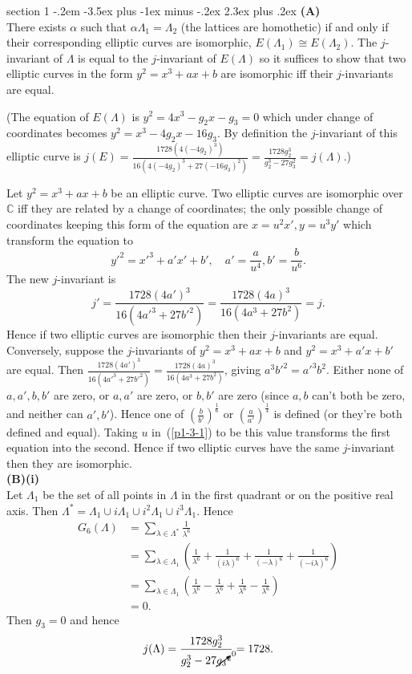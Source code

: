 \documentclass[12pt]{article}
\makeatletter
\theoremstyle{norm}
\newcommand{\C}[0]{\mathbb{C}}
\newcommand{\rc}[1]{\frac{1}{#1}}
\newcommand{\al}[0]{\alpha}
\newcommand{\la}[0]{\lambda}
\newcommand{\La}[0]{\Lambda}
\newcommand{\pa}[1]{\left( {#1} \right)}
\newcommand{\subprob}[1]{\noindent\textbf{#1}\\}
\newcommand{\pf}[2]{\pa{\frac{#1}{#2}}}
\newenvironment{problem}{\@startsection
       {section}
       {1}
       {-.2em}
       {-3.5ex plus -1ex minus -.2ex}
       {2.3ex plus .2ex}
       {\pagebreak[3]%
       \large\bf\noindent{Problem }
       }
       }
       {%
       }
\makeatother
\begin{document}
\begin{problem} {\it }
\subprob{(A)}
There exists $\al$ such that $\al\La_1=\La_2$ (the lattices are homothetic) if and only if their corresponding elliptic curves are isomorphic, $E(\La_1)\cong E(\La_2)$. The $j$-invariant of $\La$ is equal to the $j$-invariant of $E(\La)$ so it suffices to show that two elliptic curves in the form $y^2=x^3+ax+b$ are isomorphic iff their $j$-invariants are equal.

(The equation of $E(\La)$ is $y^2=4x^3-g_2x-g_3=0$ which under change of coordinates becomes $y^2=x^3-4g_2x-16g_3$. By definition the $j$-invariant of this elliptic curve is $j(E)=\frac{1728(4(-4g_2)^3)}{16(4(-4g_2)^3+27(-16g_3)^2)}=\frac{1728g_2^3}{g_2^3-27g_3^2}=j(\La)$.)

Let $y^2=x^3+ax+b$ be an elliptic curve. %
Two elliptic curves are isomorphic over $\C$ iff they are related by a change of coordinates; the only possible change of coordinates keeping this form of the equation are $x=u^2x',y=u^3y'$
which transform the equation to
\begin{equation}\label{p1-3-1}
y'^2=x'^3+a'x'+b',\quad a'=\frac{a}{u^4},b'=\frac{b}{u^6}.
\end{equation}
The new $j$-invariant is
\[
j'=\frac{1728(4a')^3}{16(4a'^3+27b'^2)}=\frac{1728(4a)^3}{16(4a^3+27b^2)}=j.
\]
Hence if two elliptic curves are isomorphic then their $j$-invariants are equal. Conversely, suppose the $j$-invariants of $y^2=x^3+ax+b$ and $y^2=x^3+a'x+b'$ are equal. Then $\frac{1728(4a')^3}{16(4a'^3+27b'^2)}=\frac{1728(4a)^3}{16(4a^3+27b^2)}$, giving $a^3b'^2=a'^3b^2$. Either none of $a,a',b,b'$ are zero, or $a,a'$ are zero, or $b,b'$ are zero (since $a,b$ can't both be zero, and neither can $a',b'$). Hence one of $\pf{b}{b'}^{\rc 6}$ or $\pf{a}{a'}^{\rc 4}$ is defined (or they're both defined and equal). Taking $u$ in~(\ref{p1-3-1}) to be this value transforms the first equation into the second. Hence if two elliptic curves have the same $j$-invariant then they are isomorphic.\\

\subprob{(B)(i)}
Let $\La_1$ be the set of all points in $\La$ in the first quadrant or on the positive real axis. Then $\La^*=\La_1\cup i\La_1\cup i^2\La_1\cup i^3\La_1$. Hence
\begin{align*}
G_6(\La)&=\sum_{\la\in \La^*}\rc{\la^6}\\
&=\sum_{\la\in \La_1}\pa{\rc{\la^6}+\rc{(i\la)^6}+\rc{(-\la)^6}+\rc{(-i\la)^6}}\\
&=\sum_{\la\in \La_1}\pa{\rc{\la^6}-\rc{\la^6}+\rc{\la^6}-\rc{\la^6}}\\
&=0.
\end{align*}
Then $g_3=0$ and hence 
\[j(\La)=\frac{1728g_2^3}{g_2^3-27\cancelto{0}{g_3}^2}=1728.\]


\end{problem}
\end{document}
